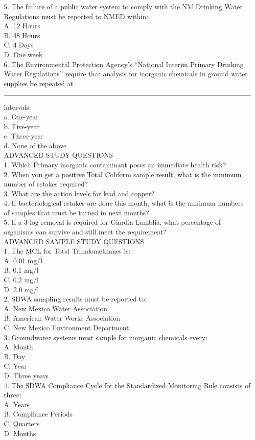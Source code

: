 5.	The failure of a public water system to comply with the NM Drinking Water Regulations must be reported to NMED within:\\
A.	12 Hours\\
B.	48 Hours\\
C.	4 Days\\
D.	One week\\

6.	The Environmental Protection Agency’s “National Interim Primary Drinking Water Regulations” require that analysis for inorganic chemicals in ground water supplies be repeated at \rule{1cm}{0.15mm} intervals.\\

a.	One-year\\
b.	Five-year\\
c.	Three-year\\
d.	None of the above\\




ADVANCED STUDY QUESTIONS\\
1.	Which Primary inorganic contaminant poses an immediate health risk?\\
2.	When you get a positive Total Coliform sample result, what is the minimum number of retakes required?\\
3.	What are the action levels for lead and copper?\\
4.	If bacteriological retakes are done this month, what is the minimum numbers of samples that must be turned in next months?\\
5.	If a 3-log removal is required for Giardia Lamblia, what percentage of organisms can survive and still meet the requirement?\\

ADVANCED SAMPLE STUDY QUESTIONS\\
1.	The MCL for Total Trihalomethanes is:\\
A.	0.01 mg/l\\
B.	0.1 mg/l\\
C.	0.2 mg/l\\
D.	2.0 mg/l\\

2.	SDWA sampling results must be reported to:\\
A.	New Mexico Water Association\\
B.	American Water Works Association\\
C.	New Mexico Environment Department\\

3.	Groundwater systems must sample for inorganic chemicals every:\\
A.	Month\\
B.	Day\\
C.	Year\\
D.	Three years\\
4.	The SDWA Compliance Cycle for the Standardized Monitoring Rule consists of three:\\
A.	Years\\
B.	Compliance Periods\\
C.	Quarters\\
D.	Months\\

